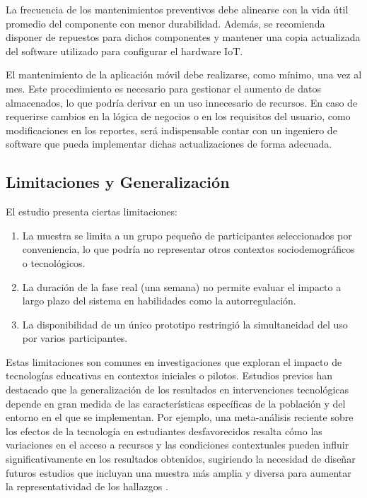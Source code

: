 La frecuencia de los mantenimientos preventivos debe alinearse con la vida útil promedio del componente con menor durabilidad. Además, se recomienda disponer de repuestos para dichos componentes y mantener una copia actualizada del software utilizado para configurar el hardware IoT.

El mantenimiento de la aplicación móvil debe realizarse, como mínimo, una vez al mes. Este procedimiento es necesario para gestionar el aumento de datos almacenados, lo que podría derivar en un uso innecesario de recursos. En caso de requerirse cambios en la lógica de negocios o en los requisitos del usuario, como modificaciones en los reportes, será indispensable contar con un ingeniero de software que pueda implementar dichas actualizaciones de forma adecuada.

\subsection{Limitaciones y Generalización}
El estudio presenta ciertas limitaciones:

\begin{enumerate}
\item La muestra se limita a un grupo pequeño de participantes seleccionados por conveniencia, lo que podría no representar otros contextos sociodemográficos o tecnológicos.
\item La duración de la fase real (una semana) no permite evaluar el impacto a largo plazo del sistema en habilidades como la autorregulación.
\item La disponibilidad de un único prototipo restringió la simultaneidad del uso por varios participantes.
\end{enumerate}

Estas limitaciones son comunes en investigaciones que exploran el impacto de tecnologías educativas en contextos iniciales o pilotos. Estudios previos han destacado que la generalización de los resultados en intervenciones tecnológicas depende en gran medida de las características específicas de la población y del entorno en el que se implementan. Por ejemplo, una meta-análisis reciente sobre los efectos de la tecnología en estudiantes desfavorecidos resalta cómo las variaciones en el acceso a recursos y las condiciones contextuales pueden influir significativamente en los resultados obtenidos, sugiriendo la necesidad de diseñar futuros estudios que incluyan una muestra más amplia y diversa para aumentar la representatividad de los hallazgos \citep{DiPietro2025Meta}.

